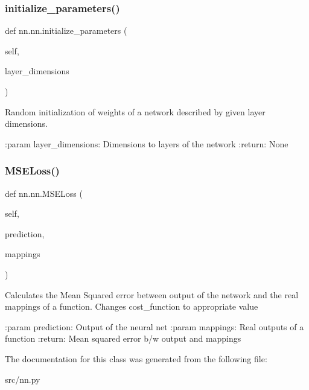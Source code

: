 \subsubsection{\texorpdfstring{initialize\+\_\+parameters()}{initialize\_parameters()}}
{\footnotesize\ttfamily def nn.\+nn.\+initialize\+\_\+parameters (\begin{DoxyParamCaption}\item[{}]{self,  }\item[{}]{layer\+\_\+dimensions }\end{DoxyParamCaption})}

\begin{DoxyVerb}Random initialization of weights of a network described by given layer
dimensions.

:param layer_dimensions: Dimensions to layers of the network
:return: None
\end{DoxyVerb}
 \mbox{\label{classnn_1_1nn_ae74a0f21e8722ea82a0f94135a81a348}} 
\subsubsection{\texorpdfstring{M\+S\+E\+Loss()}{MSELoss()}}
{\footnotesize\ttfamily def nn.\+nn.\+M\+S\+E\+Loss (\begin{DoxyParamCaption}\item[{}]{self,  }\item[{}]{prediction,  }\item[{}]{mappings }\end{DoxyParamCaption})}

\begin{DoxyVerb}Calculates the Mean Squared error between output of the network and the real mappings of a function.
Changes cost_function to appropriate value

:param prediction: Output of the neural net
:param mappings: Real outputs of a function
:return: Mean squared error b/w output and mappings
\end{DoxyVerb}
 

The documentation for this class was generated from the following file\+:\begin{DoxyCompactItemize}
\item 
src/nn.\+py\end{DoxyCompactItemize}
